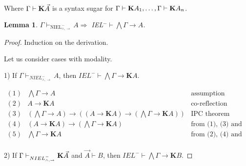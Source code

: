 \documentclass[a4paper]{article}
\newtheorem{lemma}{Lemma}
\begin{document}
Where $\Gamma \vdash {\bf K} \vec{A}$ is a syntax sugar for $\Gamma \vdash {\bf K} A_1 ,\dots, \Gamma \vdash {\bf K} A_n$.

  \vspace{\baselineskip}

  \begin{lemma}
    $\Gamma \vdash_{\text{NIEL}^{-}_{\land, \to}} A \Rightarrow$ IEL$^{-} \vdash \bigwedge \Gamma \rightarrow A$.
  \end{lemma}

  \begin{proof}
Induction on the derivation.

  \vspace{\baselineskip}

Let us consider cases with modality.

\vspace{\baselineskip}

1) If $\Gamma \vdash_{NIEL^{-}_{\land, \to}} A$, then $IEL^{-} \vdash \bigwedge \Gamma \rightarrow \textbf{K}A$.

$\begin{array}{lll}
(1) & \bigwedge \Gamma \rightarrow A & \text{assumption}\\
(2) & A \rightarrow \textbf{K}A &\text{co-reflection}\\
(3) & (\bigwedge \Gamma \rightarrow A) \rightarrow ((A \rightarrow \textbf{K}A) \rightarrow (\bigwedge \Gamma \rightarrow \textbf{K}A))&\text{IPC theorem}\\
(4) & (A \rightarrow \textbf{K}A) \rightarrow (\bigwedge \Gamma \rightarrow \textbf{K}A) &\text{from (1), (3) and MP}\\
(5) & \bigwedge \Gamma \rightarrow \textbf{K}A &\text{from (2), (4) and MP}\\
\end{array}$

\vspace{\baselineskip}

2) If $\Gamma \vdash_{NIEL^{-}_{\land, \to}} {\bf K} \vec{A}$ and $\vec{A} \vdash B$, then $IEL^{-} \vdash \bigwedge \Gamma \rightarrow \textbf{K}B$.


\end{proof}
\end{document}
